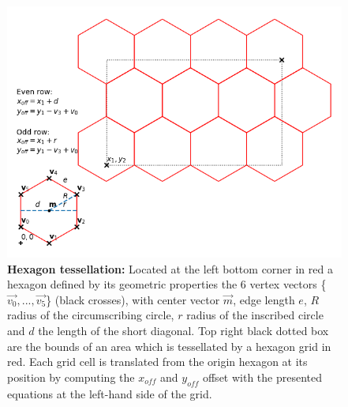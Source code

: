 		\begin{figure}[ht]
			\centering
			\includegraphics[scale=.7]{img/hexagons}
			\caption[Hexagon tessellation]{\textbf{Hexagon tessellation:} Located at the left bottom corner in red a hexagon defined by its geometric properties the 6 vertex vectors \{$\vec{v_0},...,\vec{v_5}$\} (black crosses), with center vector $\vec{m}$, edge length $e$, $R$ radius of the circumscribing circle, $r$ radius of the inscribed circle and $d$ the length of the short diagonal. Top right black dotted box are the bounds of an area which is tessellated by a hexagon grid in red. Each grid cell is translated from the origin hexagon at its position by computing the $x_{off}$ and $y_{off}$ offset with the presented equations at the left-hand side of the grid. }
			\label{fig:hexagon}
		\end{figure}

